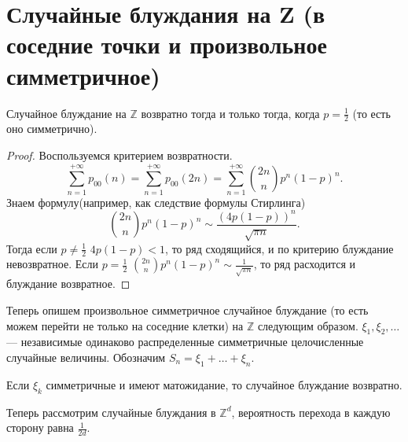 \section{Случайные блуждания на Z (в соседние точки и произвольное симметричное)}

\begin{theorem} \label{th:Zvoz}
    Случайное блуждание на $\mathbb{Z}$ возвратно тогда и только тогда, когда $p = \frac{1}{2}$ (то есть оно симметрично).
\end{theorem}

\begin{proof}
Воспользуемся критерием возвратности.
    $$\sum\limits_{n=1} ^ {+\infty} p_{00}(n) = \sum\limits_{n=1} ^ {+\infty} p_{00}(2n) = \sum\limits_{n=1} ^ {+\infty} \binom{2n}{n}p^n (1 - p)^n.$$
   Знаем формулу(например, как следствие формулы Стирлинга)
    $$\binom{2n}{n}p^n(1-p)^n \sim \frac{(4p(1-p))^n}{\sqrt{\pi n}}.$$
   Тогда
    если $ p \neq\frac{1}{2}$ $4p(1-p) < 1$, то ряд сходящийся, и по критерию блуждание невозвратное.
Если $ p =\frac{1}{2}$ $\binom{2n}{n}p^n(1-p)^n \sim \frac{1}{\sqrt{\pi n}}$, то ряд расходится и блуждание возвратное.
\end{proof}

Теперь опишем произвольное симметричное случайное блуждание (то есть можем перейти не только на соседние клетки) на $\mathbb{Z}$ следующим образом.
$\xi_1, \xi_2, \ldots$ --- независимые одинаково распределенные симметричные целочисленные случайные величины. Обозначим
$S_n = \xi_1 + \ldots + \xi_n$.

\begin{theorem}
    Если $\xi_k$ симметричные и имеют матожидание, то случайное блуждание возвратно.
\end{theorem}



Теперь рассмотрим случайные блуждания в $\mathbb{Z}^d$, вероятность перехода  в каждую сторону равна $\frac{1}{2d}$.
